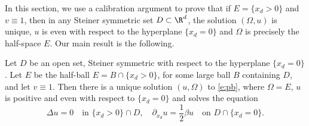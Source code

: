 In this section, we use a calibration argument to prove that if $E=\{x_d>0\}$ and $v\equiv 1$, then in any Steiner symmetric set $D\subset\R^d$, the solution $(\Omega,u)$ is unique, $u$ is even with respect to the hyperplane $\{x_d=0\}$ and $\Omega$ is precisely the half-space $E$. Our main result is the following.
\begin{prop}
Let $D$ be an open set, Steiner symmetric with respect to the hyperplane $\{x_d=0\}$. Let $E$ be the half-ball $E=B\cap\{x_d>0\}$, for some large ball $B$ containing $D$, and let $v\equiv 1$. Then there is a unique solution $(u,\Omega)$ to \eqref{e:pb}, where $\Omega=E$, $u$ is positive and even with respect to $\{x_d=0\}$ and solves the equation
\begin{equation}\label{e:esempio}
\Delta u=0\quad\text{in } \{x_d>0\}\cap D,\quad \partial_{x_d} u=\frac{1}2\beta u\quad\text{on } D\cap\{x_d=0\}.
\end{equation}
\end{prop}
